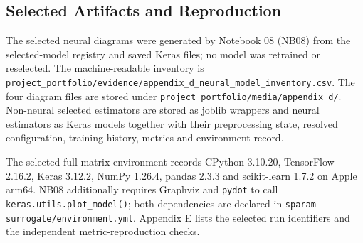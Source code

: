 \subsection{Selected Artifacts and Reproduction}
The selected neural diagrams were generated by Notebook 08 (NB08) from the
selected-model registry and saved Keras files; no model was retrained or
reselected. The machine-readable inventory is
\nolinkurl{project_portfolio/evidence/appendix_d_neural_model_inventory.csv}.
The four diagram files are stored under
\nolinkurl{project_portfolio/media/appendix_d/}. Non-neural selected estimators
are stored as joblib wrappers and neural estimators as Keras models together
with their preprocessing state, resolved configuration, training history,
metrics and environment record.

The selected full-matrix environment records CPython 3.10.20, TensorFlow 2.16.2,
Keras 3.12.2, NumPy 1.26.4, pandas 2.3.3 and scikit-learn 1.7.2 on Apple arm64.
NB08 additionally requires Graphviz and \texttt{pydot} to call
\texttt{keras.utils.plot\_model()}; both dependencies are declared in
\nolinkurl{sparam-surrogate/environment.yml}. Appendix E lists the selected run
identifiers and the independent metric-reproduction checks.

\clearpage
